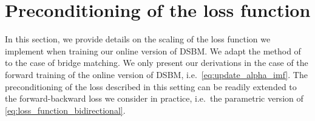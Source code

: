 \documentclass{article}
\begin{document}
\section{Preconditioning of the loss function}
\label{sec:preconditioning_loss}

In this section, we provide details on the scaling of the loss function we implement when training our online version of DSBM. We adapt the method of \cite[Appendix B.2]{karras2022elucidating} to the case of bridge matching. We only present our derivations in the case of the forward training of the online version of DSBM, i.e.~\eqref{eq:update_alpha_imf}. The preconditioning of the loss described in this setting can be readily extended to the forward-backward loss we consider in practice, i.e.~the parametric version of \eqref{eq:loss_function_bidirectional}.
\end{document}
